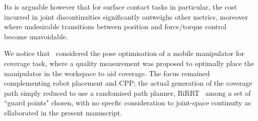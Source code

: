 \documentclass[conference]{IEEEtran}
\begin{document}
Its is arguable however that for surface contact tasks in particular, the cost incurred in joint discontinuities significantly 
outweighs other metrics, moreover where undesirable transitions between position and force/torque control~\cite{cheah2003brief}~\cite{heck2015switched}~\cite{mirrazavi2018a}~\cite{solanes2018adaptive}~\cite{Solanes2018Robust} become unavoidable. %


We notice that~\cite{paus2017a} considered the pose optimisation of a mobile manipulator for coverage task, 
where a quality measurement was proposed to optimally place the manipulator in the workspace to aid coverage. 
The focus remained complementing robot placement and CPP; the actual generation of the coverage path simply reduced to use 
a randomised path planner, BiRRT~\cite{LaValle2001Randomized} %
among a set of  ``guard points" chosen, with no specfic consideration to joint-space continuity as ellaborated in the present manuscript. 
\end{document}
